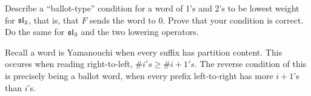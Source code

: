 \documentclass[12pt]{memoir}
\begin{document}
\begin{Ej}
    Describe a ``ballot-type'' condition for a word of 1's and 2's to be lowest weight for $\mathfrak{sl}_2$, that is, that $F$ sends the word to $0$. Prove that your condition is correct. Do the same for $\mathfrak{sl}_3$ and the two lowering operators.
\end{Ej}

\begin{ptcbr}
   Recall a word is Yamanouchi when every suffix has partition content. This occures when reading right-to-left, $\#i's\geq\#i+1's$. The reverse condition of this is precisely being a ballot word, when every prefix left-to-right has more $i+1$'s than $i$'s.
\end{ptcbr}
\end{document}
